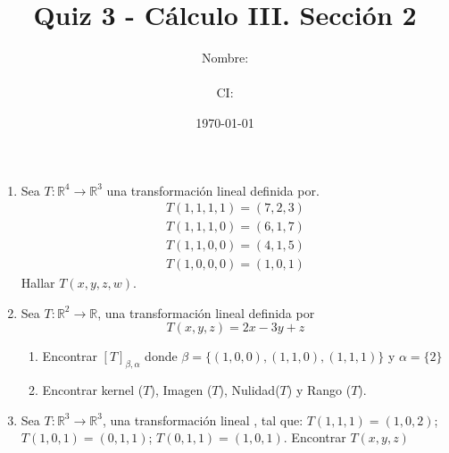 \documentclass[12pt]{article}
\title{Quiz 3 - Cálculo III. Sección 2}
\author{Nombre: \rule{7cm}{0.4pt}  CI: \rule{5cm}{0.4pt}}
\date{\today}
\begin{document}
\maketitle

\begin{enumerate}
    \item Sea $T: \mathbb{R}^4\to\mathbb{R}^3$ una transformación lineal definida por.
  \begin{align*}
    T(1,1,1,1) = (7,2,3)\\
    T(1,1,1,0) =(6,1,7)\\
    T(1,1,0,0) = (4,1,5)\\
    T(1,0,0,0) = (1,0,1)
  \end{align*}
  Hallar $T( x,y,z,w)$.
  \item Sea $T: \mathbb{R}^2\to\mathbb{R}$, una transformación lineal definida por
  $$
  T (x,y,z) = 2x -3y + z
  $$
  \begin{enumerate}
    \item Encontrar $[T]_{\beta,\alpha}$ donde $\beta = \{(1,0,0),(1,1,0),(1,1,1)\}$ y $\alpha =\{2\}$
    \item  Encontrar kernel ($T$), Imagen ($T$), Nulidad($T$) y Rango ($T$).
  \end{enumerate}
  \item Sea $T: \mathbb{R}^3\to\mathbb{R}^3$, una transformación lineal , tal que: $T (1,1,1) = (1,0,2)$; $T( 1,0,1) = (0,1,1)$; $T ( 0,1,1) = ( 1,0,1)$. Encontrar $T(x,y,z)$
\end{enumerate}
\end{document}
